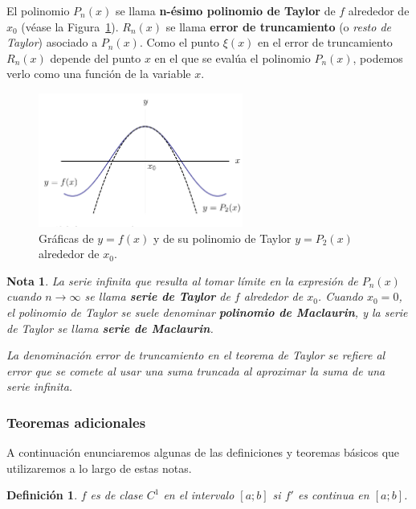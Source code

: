 \documentclass[12pt]{article}
\newtheorem{Note}{Nota}%
\newtheorem{Def}{Definici\'on}
\begin{document}
El polinomio $P_n(x) $ se llama \textbf{n-ésimo polinomio de Taylor} de $f $ alrededor de $x_0 $ (véase la Figura~\ref{fig:taylor}).   $R_n(x) $ se llama \textbf{error de truncamiento} (o \textit{resto de Taylor}) asociado a $P_n(x) $.   Como el punto $\xi(x) $ en el error de truncamiento $R_n(x) $ depende del punto $x $ en el que se evalúa el polinomio $P_n(x) $, podemos verlo como una función de la variable $x $.

\begin{figure}[H]
\centering
\includegraphics[width=0.6\textwidth]{Fig5.png}
\caption{Gráficas de $y = f(x) $ y de su polinomio de Taylor $y = P_2(x) $ alrededor de $x_0 $.}
\label{fig:taylor}
\end{figure}

\begin{Note}
La serie infinita que resulta al tomar límite en la expresión de $P_n(x) $ cuando $n \to \infty $ se llama \textbf{serie de Taylor} de $f $ alrededor de $x_0 $. Cuando $x_0 = 0 $, el polinomio de Taylor se suele denominar \textbf{polinomio de Maclaurin}, y la serie de Taylor se llama \textbf{serie de Maclaurin}.\bigskip

La denominación \textit{error de truncamiento} en el teorema de Taylor se refiere al error que se comete al usar una suma truncada al aproximar la suma de una serie infinita.
\end{Note}

\subsubsection{Teoremas adicionales}

A continuación enunciaremos algunas de las definiciones y teoremas básicos que utilizaremos a lo largo de estas notas.

\begin{Def}$f$ es de clase $C^1$ en el intervalo $[a;b]$ si $f'$ es continua en $[a;b]$.
\end{Def}
\end{document}

